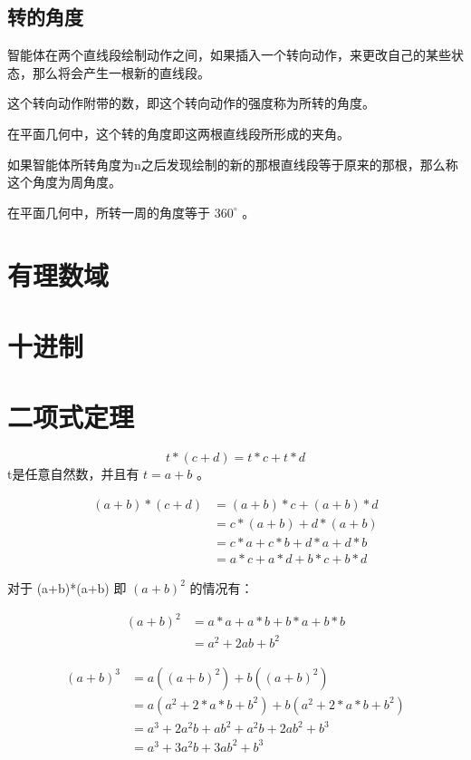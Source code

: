 \documentclass[12pt,oneside]{book}
\begin{document}
\subsection{转的角度}
智能体在两个直线段绘制动作之间，如果插入一个转向动作，来更改自己的某些状态，那么将会产生一根新的直线段。

这个转向动作附带的数，即这个转向动作的强度称为所转的角度。

在平面几何中，这个转的角度即这两根直线段所形成的夹角。

如果智能体所转角度为n之后发现绘制的新的那根直线段等于原来的那根，那么称这个角度为周角度。

在平面几何中，所转一周的角度等于 $360^{\circ}$ 。



\section{有理数域}


\section{十进制}




\section{二项式定理}
\begin{equation*}
t*(c + d) = t*c + t*d
\end{equation*}
t是任意自然数，并且有 $t=a+b$ 。

\begin{align*}
(a+b)*(c + d) &= (a+b)*c + (a+b)*d\\
                    &=c*(a+b) + d*(a+b)\\
                    &=c*a + c* b + d*a + d*b\\
                    &=a*c + a*d + b*c + b*d
\end{align*}

对于 (a+b)*(a+b) 即 $(a+b)^2$ 的情况有：

\begin{align*}
(a+b)^2 &= a*a + a*b + b*a + b*b\\
    &=a^2 + 2ab + b^2 
\end{align*}



\begin{align*}
(a+b)^3 &= a((a+b)^2) + b((a+b)^2)\\
    &=a(a^2 + 2 * a * b + b^2 )  + b(a^2 + 2 * a * b + b^2 )\\
    &=a^3 + 2a^2b + ab^2 + a^2b + 2ab^2 + b^3\\
    &=a^3 + 3a^2b + 3ab^2 + b^3
\end{align*}
\end{document}
